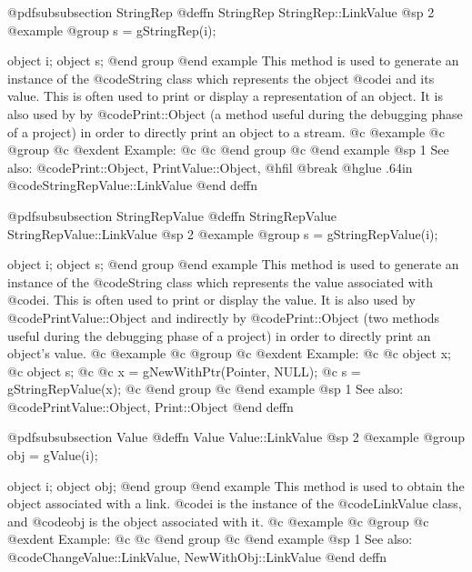 @pdfsubsubsection {StringRep}
@deffn {StringRep} StringRep::LinkValue
@sp 2
@example
@group
s = gStringRep(i);

object  i;
object  s;
@end group
@end example
This method is used to generate an instance of the @code{String} class
which represents the object @code{i} and its value.  This is often used
to print or display a representation of an object.  It is also used by
by @code{Print::Object} (a method useful during the debugging phase of
a project) in order to directly print an object to a stream.
@c @example
@c @group
@c @exdent Example:
@c 
@c @end group
@c @end example
@sp 1
See also:  @code{Print::Object, PrintValue::Object,}
@hfil @break @hglue .64in      @code{StringRepValue::LinkValue}
@end deffn









@pdfsubsubsection {StringRepValue}
@deffn {StringRepValue} StringRepValue::LinkValue
@sp 2
@example
@group
s = gStringRepValue(i);

object  i;
object  s;
@end group
@end example
This method is used to generate an instance of the @code{String} class
which represents the value associated with @code{i}.  This is often
used to print or display the value.  It is also used by
@code{PrintValue::Object} and indirectly by @code{Print::Object}
(two methods useful during the debugging phase of a project)
in order to directly print an object's value.
@c @example
@c @group
@c @exdent Example:
@c 
@c object  x;
@c object  s;
@c 
@c x = gNewWithPtr(Pointer, NULL);
@c s = gStringRepValue(x);
@c @end group
@c @end example
@sp 1
See also:  @code{PrintValue::Object, Print::Object}
@end deffn






@pdfsubsubsection {Value}
@deffn {Value} Value::LinkValue
@sp 2
@example
@group
obj = gValue(i);

object  i;
object  obj;
@end group
@end example
This method is used to obtain the object associated with a link.
@code{i} is the instance of the @code{LinkValue} class, and
@code{obj} is the object associated with it.
@c @example
@c @group
@c @exdent Example:
@c 
@c @end group
@c @end example
@sp 1
See also:  @code{ChangeValue::LinkValue, NewWithObj::LinkValue}
@end deffn









